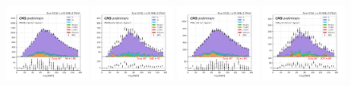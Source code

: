 \begin{figure}
    
    \includegraphics[width=0.24\textwidth]{chapters/Appendix/sectionQCD/figures/mutau_>=2_==1_dilepton_mass.png}
    \includegraphics[width=0.24\textwidth]{chapters/Appendix/sectionQCD/figures/mutau_ss_>=2_==1_dilepton_mass.png}
    \includegraphics[width=0.24\textwidth]{chapters/Appendix/sectionQCD/figures/etau_>=2_==1_dilepton_mass.png}
    \includegraphics[width=0.24\textwidth]{chapters/Appendix/sectionQCD/figures/etau_ss_>=2_==1_dilepton_mass.png}
    

\end{figure}
